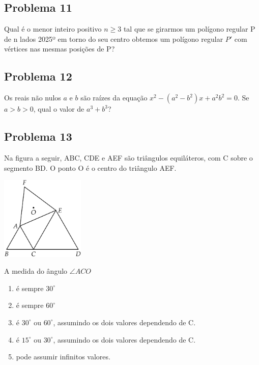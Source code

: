 \documentclass[12pt]{article}
\begin{document}
\clearpage

\subsection{Problema 11}
\begin{tcolorbox}[statementbox]
Qual é o menor inteiro positivo \(n \geq 3\) tal que se girarmos um polígono regular P de n lados 2025º em torno do seu centro
obtemos um polígono regular \(P'\) com vértices nas mesmas posições de P?
\end{tcolorbox}

\clearpage

\subsection{Problema 12}
\begin{tcolorbox}[statementbox]
Os reais não nulos \(a\) e \(b\) são raízes da equação \(x^2 - (a^2-b^2)x + a^2b^2 = 0\). Se \(a > b > 0\), qual o valor de
\(a^3+b^3\)?
\end{tcolorbox}

\clearpage

\subsection{Problema 13}
\begin{tcolorbox}[statementbox]
Na figura a seguir, ABC, CDE e AEF são triângulos equiláteros, com C sobre o segmento BD. O ponto O é o centro do triângulo AEF.
\begin{center}
  \includegraphics[width=0.3\textwidth]{fifth.png}
\end{center}
A medida do ângulo \(\angle ACO\)
          \begin{enumerate}[label=({\Alph*})]
            \item é sempre $30^{\circ}$
            \item é sempre $60^{\circ}$
            \item  é $30^{\circ}$ ou $60^{\circ}$, assumindo os dois valores dependendo de C.
            \item é $15^{\circ}$ ou $30^{\circ}$, assumindo os dois valores dependendo de C.
            \item pode assumir infinitos valores.
          \end{enumerate}

\end{tcolorbox}
\end{document}
